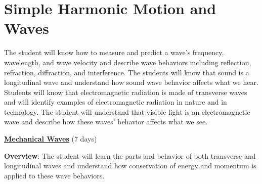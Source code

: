 \documentclass[dvipsnames]{article}
\begin{document}
\section{Simple Harmonic Motion and Waves}

\vspace{-3pt}
The student will know how to measure and predict a wave's frequency, wavelength, and wave velocity and describe wave behaviors including reflection, refraction, diffraction, and interference.  The students will know that sound is a longitudinal wave and understand how sound wave behavior affects what we hear.  Students will know that electromagnetic radiation is made of transverse waves and will identify examples of electromagnetic radiation in nature and in technology.  The student will understand that visible light is an electromagnetic wave and describe how these waves' behavior affects what we see.
\vspace{3pt}

\textbf{\underline{Mechanical Waves}} (7 days)

\textbf{Overview}: The student will learn the parts and behavior of both transverse and longitudinal waves and understand how conservation of energy and momentum is applied to these wave behaviors.
\end{document}
